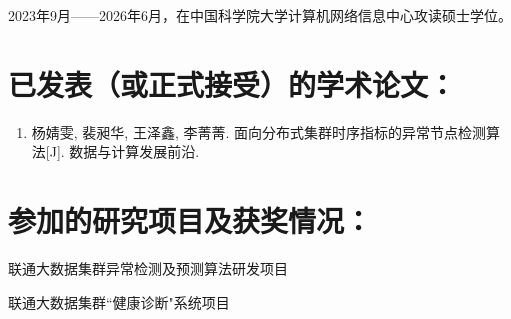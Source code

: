 2023年9月——2026年6月，在中国科学院大学计算机网络信息中心攻读硕士学位。


\section*{已发表（或正式接受）的学术论文：}

{
\setlist[enumerate]{}%
\begin{enumerate}[nosep]
    \item 杨婧雯, 裴昶华, 王泽鑫, 李菁菁. 面向分布式集群时序指标的异常节点检测算法[J]. 数据与计算发展前沿.
\end{enumerate}
}

\section*{参加的研究项目及获奖情况：}
联通大数据集群异常检测及预测算法研发项目

联通大数据集群``健康诊断"系统项目


\cleardoublepage[plain]%
